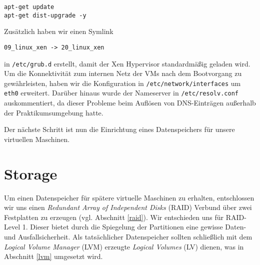 \begin{verbatim}
apt-get update
apt-get dist-upgrade -y
\end{verbatim}
Zusätzlich haben wir einen Symlink 
\setupVerbatimOut 
\begin{verbatim} 
09_linux_xen -> 20_linux_xen 
\end{verbatim} 
in \verb#/etc/grub.d# erstellt, damit der Xen Hypervisor standardmäßig geladen wird.
\\
Um die Konnektivität zum internen Netz der VMs nach dem Bootvorgang zu gewährleisten, haben wir die Konfiguration in \verb#/etc/network/interfaces# um \verb#eth0# erweitert. Darüber hinaus wurde der Nameserver in \verb#/etc/resolv.conf# auskommentiert, da dieser Probleme beim Auflösen von DNS-Einträgen außerhalb der Praktikumsumgebung hatte.

Der nächste Schritt ist nun die Einrichtung eines Datenspeichers für unsere virtuellen Maschinen.

\chapter{Storage}\label{chap:stor}
Um einen Datenspeicher für spätere virtuelle Maschinen zu erhalten, entschlossen wir uns einen \emph{Redundant Array of Independent Disks} (RAID) Verbund über zwei Festplatten zu erzeugen (vgl. Abschnitt \ref{raid}). Wir entschieden uns für RAID-Level 1. Dieser bietet durch die Spiegelung der Partitionen eine gewisse Daten- und Ausfallsicherheit. Als tatsächlicher Datenspeicher sollten schließlich mit dem \emph{Logical Volume Manager} (LVM) erzeugte \emph{Logical Volumes} (LV) dienen, was in Abschnitt \ref{lvm} umgesetzt wird.
